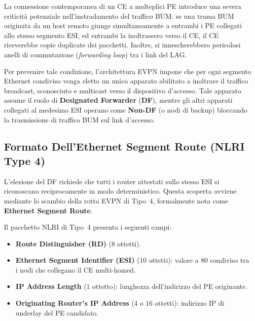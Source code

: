 \documentclass[11pt, a4paper]{article}
\begin{document}
La connessione contemporanea di un CE a molteplici PE introduce una severa criticità potenziale nell'instradamento del traffico BUM: se una trama BUM originata da un host remoto giunge simultaneamente a entrambi i PE collegati allo stesso segmento ESI, ed entrambi la inoltrassero verso il CE, il CE riceverebbe copie duplicate dei pacchetti. Inoltre, si innescherebbero pericolosi anelli di commutazione (\emph{forwarding loop}) tra i link del LAG.

Per prevenire tale condizione, l'architettura EVPN impone che per ogni segmento Ethernet condiviso venga eletto un unico apparato abilitato a inoltrare il traffico broadcast, sconosciuto e multicast verso il dispositivo d'accesso. Tale apparato assume il ruolo di \textbf{Designated Forwarder} (\textbf{DF}), mentre gli altri apparati collegati al medesimo ESI operano come \textbf{Non-DF} (o nodi di backup) bloccando la trasmissione di traffico BUM sul link d'accesso.


\subsection{Formato Dell'Ethernet Segment Route (NLRI Type 4)}

L'elezione del DF richiede che tutti i router attestati sullo stesso ESI si riconoscano reciprocamente in modo deterministico. Questa scoperta avviene mediante lo scambio della rotta EVPN di Tipo~4, formalmente nota come \textbf{Ethernet Segment Route}.


Il pacchetto NLRI di Tipo~4 presenta i seguenti campi:
\begin{itemize}[noitemsep]
    \item \textbf{Route Distinguisher (RD)} ($8$ ottetti).
    \item \textbf{Ethernet Segment Identifier (ESI)} ($10$ ottetti): valore a \SI{80}{\bit} condiviso tra i nodi che collegano il CE multi-homed.
    \item \textbf{IP Address Length} ($1$ ottetto): lunghezza dell'indirizzo del PE originante.
    \item \textbf{Originating Router's IP Address} ($4$ o $16$ ottetti): indirizzo IP di underlay del PE candidato.
\end{itemize}
\end{document}
